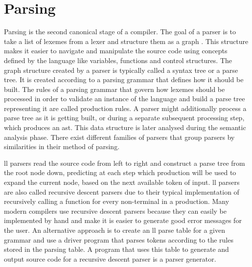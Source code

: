 
\begin{comment}
\cite{sinya_simultaneous_2013} propose a novel type of finite automata called
\gls{sfa}.
\newline \newline
Mention \cite{lin_accelerating_2013, wang_hyperscan_2019,
li_plex_2021, asthagiri_associative_1992} Go and look at references cited in
\cite{zhao_--fly_2015}
\newline \newline
Could mention these but the fella doesn't do anything novel (and his
grammar is questionable) \cite{barve_parallel_2014, barve_parallel_2012,
barve_improved_2015}
\end{comment}

\section{Parsing} \label{lit_review_parsing}

Parsing is the second canonical stage of a compiler. The goal of a parser
is to take a list of lexemes from a lexer and structure them as a graph
\citep{scott_programming_2015}. This structure makes it easier to navigate
and manipulate the source code using concepts defined by the language like
variables, functions and control structures. The graph structure created by
a parser is typically called a syntax tree or a parse tree. It is created
according to a parsing grammar that defines how it should be built. The rules
of a parsing grammar that govern how lexemes should be processed in order to
validate an instance of the language and build a parse tree representing it
are called production rules. A parser might additionally process a parse tree
as it is getting built, or during a separate subsequent processing step, which
produces an \gls{ast}. This data structure is later analysed during the semantic
analysis phase. There exist different families of parsers that group parsers by
similarities in their method of parsing.

\gls{ll} parsers read the source code from left to right and construct a parse
tree from the root node down, predicting at each step which production will be
used to expand the current node, based on the next available token of input.
\gls{ll} parsers are also called recursive descent parsers due to their typical
implementation of recursively calling a function for every non-terminal in a
production. Many modern compilers use recursive descent parsers because they
can easily be implemented by hand and make it is easier to generate good error
messages for the user. An alternative approach is to create an \gls{ll} parse
table for a given grammar and use a driver program that parses tokens according
to the rules stored in the parsing table. A program that uses this table to
generate and output source code for a recursive descent parser is a parser
generator.

